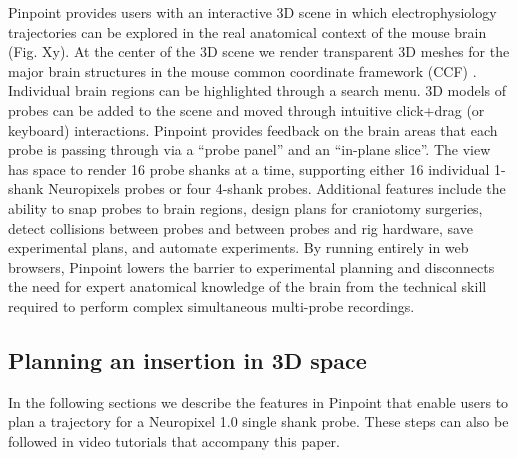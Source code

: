 
Pinpoint provides users with an interactive 3D scene in which electrophysiology trajectories can be explored in the real anatomical context of the mouse brain (Fig. Xy). At the center of the 3D scene we render transparent 3D meshes for the major brain structures in the mouse common coordinate framework (CCF) \citep{wang2020allen}. Individual brain regions can be highlighted through a search menu. 3D models of probes can be added to the scene and moved through intuitive click+drag (or keyboard) interactions. Pinpoint provides feedback on the brain areas that each probe is passing through via a ``probe panel'' and an ``in-plane slice''. The view has space to render 16 probe shanks at a time, supporting either 16 individual 1-shank Neuropixels probes or four 4-shank probes. Additional features include the ability to snap probes to brain regions, design plans for craniotomy surgeries, detect collisions between probes and between probes and rig hardware, save experimental plans, and automate experiments. By running entirely in web browsers, Pinpoint lowers the barrier to experimental planning and disconnects the need for expert anatomical knowledge of the brain from the technical skill required to perform complex simultaneous multi-probe recordings. 


\subsection{Planning an insertion in 3D space}

In the following sections we describe the features in Pinpoint that enable users to plan a trajectory for a Neuropixel 1.0 single shank probe. These steps can also be followed in video tutorials that accompany this paper. 

